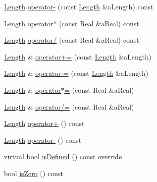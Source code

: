 \begin{DoxyCompactItemize}
\item 
\hyperlink{classostk_1_1physics_1_1units_1_1_length}{Length} \hyperlink{classostk_1_1physics_1_1units_1_1_length_a7ead71a73994b72fea9cbee1763c921f}{operator-\/} (const \hyperlink{classostk_1_1physics_1_1units_1_1_length}{Length} \&a\+Length) const
\item 
\hyperlink{classostk_1_1physics_1_1units_1_1_length}{Length} \hyperlink{classostk_1_1physics_1_1units_1_1_length_a58a2e430e8a6296e7eca6e5307d5805d}{operator$\ast$} (const Real \&a\+Real) const
\item 
\hyperlink{classostk_1_1physics_1_1units_1_1_length}{Length} \hyperlink{classostk_1_1physics_1_1units_1_1_length_a7fa05d1bb3642cb9bf8b46331f273e77}{operator/} (const Real \&a\+Real) const
\item 
\hyperlink{classostk_1_1physics_1_1units_1_1_length}{Length} \& \hyperlink{classostk_1_1physics_1_1units_1_1_length_a7903485eb0e4d3f92cdbd8436ecb5adc}{operator+=} (const \hyperlink{classostk_1_1physics_1_1units_1_1_length}{Length} \&a\+Length)
\item 
\hyperlink{classostk_1_1physics_1_1units_1_1_length}{Length} \& \hyperlink{classostk_1_1physics_1_1units_1_1_length_a9006163f65f5bb808a4956d5302f3802}{operator-\/=} (const \hyperlink{classostk_1_1physics_1_1units_1_1_length}{Length} \&a\+Length)
\item 
\hyperlink{classostk_1_1physics_1_1units_1_1_length}{Length} \& \hyperlink{classostk_1_1physics_1_1units_1_1_length_a6cb940402ce088d7b349bf4f4ca57cdf}{operator$\ast$=} (const Real \&a\+Real)
\item 
\hyperlink{classostk_1_1physics_1_1units_1_1_length}{Length} \& \hyperlink{classostk_1_1physics_1_1units_1_1_length_a5c174bd65d9f38fad8d84b82896d0ebb}{operator/=} (const Real \&a\+Real)
\item 
\hyperlink{classostk_1_1physics_1_1units_1_1_length}{Length} \hyperlink{classostk_1_1physics_1_1units_1_1_length_af9407866f7c1663f70dbc88a6a1643e7}{operator+} () const
\item 
\hyperlink{classostk_1_1physics_1_1units_1_1_length}{Length} \hyperlink{classostk_1_1physics_1_1units_1_1_length_ad1fd07ab8009d0db1fc57847fb3ac04f}{operator-\/} () const
\item 
virtual bool \hyperlink{classostk_1_1physics_1_1units_1_1_length_aa176a675943dfe488fe96005c5405304}{is\+Defined} () const override
\item 
bool \hyperlink{classostk_1_1physics_1_1units_1_1_length_a514810fdec98e8a21d04ae494e0d71ef}{is\+Zero} () const
\item 

\end{DoxyCompactItemize}
